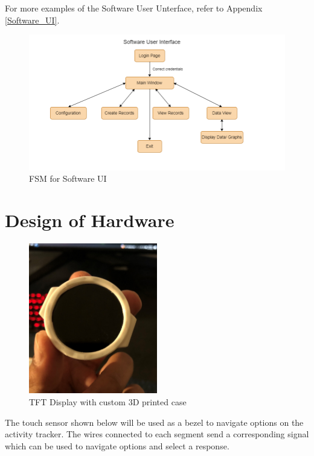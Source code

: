 \documentclass[12pt, titlepage]{article}
\begin{document}
For more examples of the Software User Unterface, refer to Appendix \ref{Software_UI}.

\begin{figure}[H]
	\begin{center}
		 \includegraphics[width=1\textwidth]{SoftwareUI_FSM}
		\caption{FSM for Software UI}
		\label{SoftwareUI_FSM} 
	\end{center}
\end{figure}

\section{Design of Hardware}

\begin{figure}[H]
	\begin{center}
		 \includegraphics[width=0.5\textwidth]{DisplayCase}
		\caption{TFT Display with custom 3D printed case}
		\label{DisplayCase} 
	\end{center}
\end{figure}


The touch sensor shown below will be used as a bezel to navigate options on the activity tracker. The wires connected to each segment send a corresponding signal which can be used to navigate options and select a response.
\end{document}
